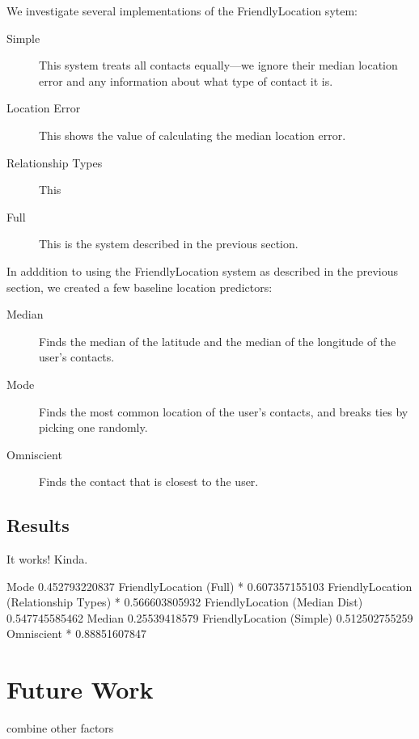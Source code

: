 \documentclass{sig-alternate}
\begin{document}
We investigate several implementations of the FriendlyLocation sytem:
\begin{description}
\item[Simple] This system treats all contacts equally---we ignore their median location error and any information about what type of contact it is.
\item[Location Error] This shows the value of calculating the median location error.
\item[Relationship Types] This 
\item[Full] This is the system described in the previous section.
\end{description}

In adddition to using the FriendlyLocation system as described in the previous section, we created a few baseline location predictors:
\begin{description}
\item[Median] Finds the median of the latitude and the median of the longitude of the user's contacts.
\item[Mode] Finds the most common location of the user's contacts, and breaks ties by picking one randomly.
\item[Omniscient] Finds the contact that is closest to the user.
\end{description}

\subsection{Results}
\begin{figure}
\centering
{}
\caption{
}
\label{fig:FinalResults}
\end{figure}

It works! Kinda.

Mode 0.452793220837
FriendlyLocation (Full) * 0.607357155103
FriendlyLocation (Relationship Types) * 0.566603805932
FriendlyLocation (Median Dist) 0.547745585462
Median 0.25539418579
FriendlyLocation (Simple) 0.512502755259
Omniscient * 0.88851607847


\section{Future Work}
combine other factors


 
\end{document}
